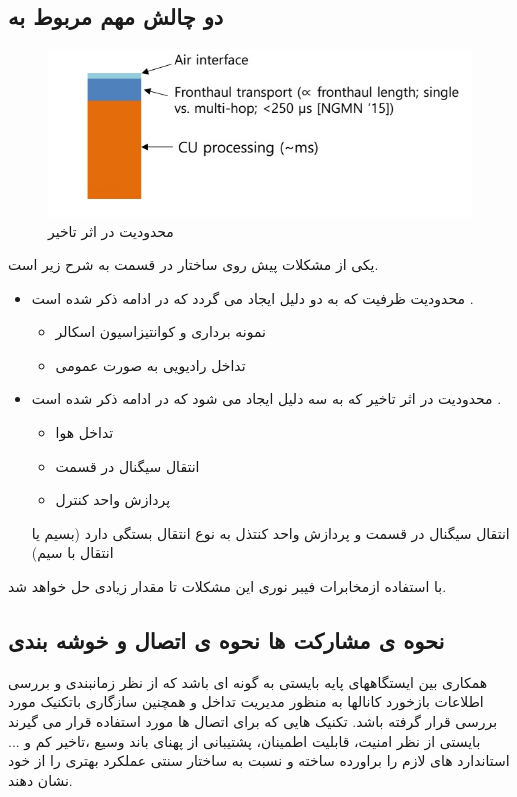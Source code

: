 \subsection{دو چالش مهم مربوط به }
 \begin{figure}
  \centering
    \includegraphics[scale=0.7]{./pic1/c6}
  \caption{محدودیت در اثر تاخیر \cite{simeoneConf}  }
  \label{fig:c6}
\end{figure}
یکی از مشکلات پیش روی ساختار  در قسمت  به شرح زیر است.
\begin{itemize}
\item
 محدودیت ظرفیت که
 به دو دلیل ایجاد می گردد که در ادامه ذکر شده است \cite{simeoneConf}.
 \begin{itemize}
 \item
 نمونه برداری و کوانتیزاسیون اسکالر
 \item
 تداخل رادیویی به صورت عمومی
 \end{itemize}
  
 \item 
  محدودیت در اثر تاخیر که
   به سه دلیل ایجاد می شود که در ادامه ذکر شده است \cite{simeoneConf}.
  \begin{itemize}
 \item
 تداخل هوا
 \item
 انتقال سیگنال در قسمت 
 \item
 پردازش واحد کنترل
 \end{itemize}
   انتقال سیگنال در قسمت  و پردازش واحد کنتذل به نوع انتقال  بستگی دارد (بسیم یا انتقال با سیم) 
\end{itemize}
با استفاده ازمخابرات فیبر نوری این مشکلات تا مقدار زیادی حل خواهد شد. 
\subsection{نحوه ی مشارکت  ها نحوه ی اتصال
و خوشه بندی}

همکاری بین ایستگاههای پایه بایستی به گونه ای باشد
که از نظر زمانبندی و بررسی اطلاعات بازخورد کانالها
به منظور مدیریت تداخل و همچنین سازگاری باتکنیک
   مورد بررسی قرار گرفته باشد.
تکنیک هایی که برای اتصال ها مورد استفاده قرار
می گیرند بایستی از نظر امنیت، قابلیت اطمینان، پشتیبانی
از پهنای باند وسیع ،تاخیر کم و ... استاندارد های لازم را
براورده ساخته و نسبت به ساختار سنتی عملکرد بهتری را
از خود نشان دهند.
